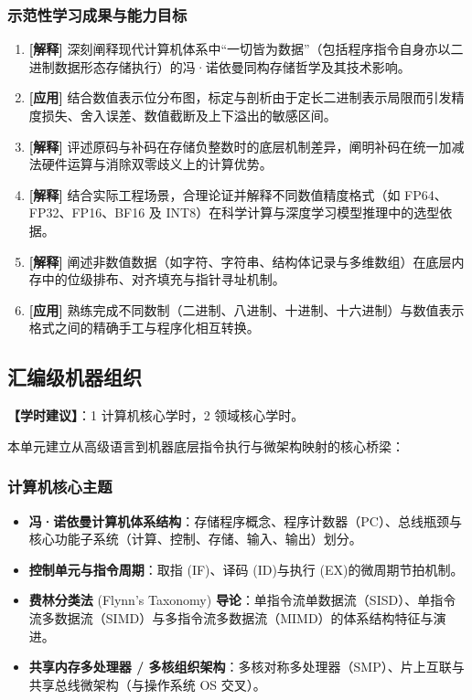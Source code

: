 \subsubsection{示范性学习成果与能力目标}
\begin{enumerate}
    \item \textbf{[解释]} 深刻阐释现代计算机体系中“一切皆为数据”（包括程序指令自身亦以二进制数据形态存储执行）的冯·诺依曼同构存储哲学及其技术影响。
    \item \textbf{[应用]} 结合数值表示位分布图，标定与剖析由于定长二进制表示局限而引发精度损失、舍入误差、数值截断及上下溢出的敏感区间。
    \item \textbf{[解释]} 评述原码与补码在存储负整数时的底层机制差异，阐明补码在统一加减法硬件运算与消除双零歧义上的计算优势。
    \item \textbf{[解释]} 结合实际工程场景，合理论证并解释不同数值精度格式（如 FP64、FP32、FP16、BF16 及 INT8）在科学计算与深度学习模型推理中的选型依据。
    \item \textbf{[解释]} 阐述非数值数据（如字符、字符串、结构体记录与多维数组）在底层内存中的位级排布、对齐填充与指针寻址机制。
    \item \textbf{[应用]} 熟练完成不同数制（二进制、八进制、十进制、十六进制）与数值表示格式之间的精确手工与程序化相互转换。
\end{enumerate}

\subsection{汇编级机器组织}
\textbf{【学时建议】}：1 计算机核心学时，2 领域核心学时。

本单元建立从高级语言到机器底层指令执行与微架构映射的核心桥梁：

\subsubsection{计算机核心主题}
\begin{itemize}
    \item \textbf{冯·诺依曼计算机体系结构}：存储程序概念、程序计数器（PC）、总线瓶颈与核心功能子系统（计算、控制、存储、输入、输出）划分。
    \item \textbf{控制单元与指令周期}：取指 (IF)、译码 (ID)与执行 (EX)的微周期节拍机制。
    \item \textbf{费林分类法} (Flynn's Taxonomy) \textbf{导论}：单指令流单数据流（SISD）、单指令流多数据流（SIMD）与多指令流多数据流（MIMD）的体系结构特征与演进。
    \item \textbf{共享内存多处理器 / 多核组织架构}：多核对称多处理器（SMP）、片上互联与共享总线微架构（与操作系统 OS 交叉）。
\end{itemize}

